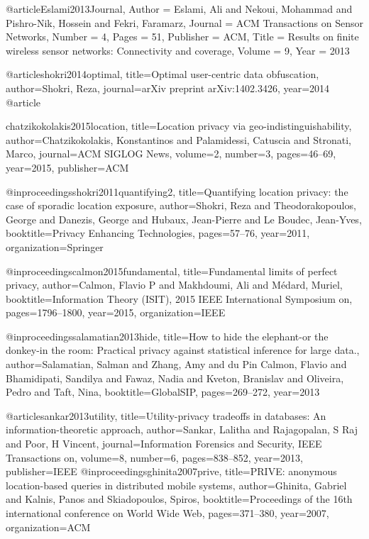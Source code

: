 {{@article{Eslami2013Journal,
	Author = {Eslami, Ali and Nekoui, Mohammad and Pishro-Nik, Hossein and Fekri, Faramarz},
	Journal = {ACM Transactions on Sensor Networks},
	Number = {4},
	Pages = {51},
	Publisher = {ACM},
	Title = {Results on finite wireless sensor networks: Connectivity and coverage},
	Volume = {9},
	Year = {2013}}

@article{shokri2014optimal,
	  title={Optimal user-centric data obfuscation},
 	 author={Shokri, Reza},
 	 journal={arXiv preprint arXiv:1402.3426},
 	 year={2014}
	}
@article{chatzikokolakis2015location,
  title={Location privacy via geo-indistinguishability},
  author={Chatzikokolakis, Konstantinos and Palamidessi, Catuscia and Stronati, Marco},
  journal={ACM SIGLOG News},
  volume={2},
  number={3},
  pages={46--69},
  year={2015},
  publisher={ACM}

}
@inproceedings{shokri2011quantifying2,
  title={Quantifying location privacy: the case of sporadic location exposure},
  author={Shokri, Reza and Theodorakopoulos, George and Danezis, George and Hubaux, Jean-Pierre and Le Boudec, Jean-Yves},
  booktitle={Privacy Enhancing Technologies},
  pages={57--76},
  year={2011},
  organization={Springer}
}

@inproceedings{calmon2015fundamental,
  title={Fundamental limits of perfect privacy},
  author={Calmon, Flavio P and Makhdoumi, Ali and M{\'e}dard, Muriel},
  booktitle={Information Theory (ISIT), 2015 IEEE International Symposium on},
  pages={1796--1800},
  year={2015},
  organization={IEEE}
}

@inproceedings{salamatian2013hide,
  title={How to hide the elephant-or the donkey-in the room: Practical privacy against statistical inference for large data.},
  author={Salamatian, Salman and Zhang, Amy and du Pin Calmon, Flavio and Bhamidipati, Sandilya and Fawaz, Nadia and Kveton, Branislav and Oliveira, Pedro and Taft, Nina},
  booktitle={GlobalSIP},
  pages={269--272},
  year={2013}
}

@article{sankar2013utility,
  title={Utility-privacy tradeoffs in databases: An information-theoretic approach},
  author={Sankar, Lalitha and Rajagopalan, S Raj and Poor, H Vincent},
  journal={Information Forensics and Security, IEEE Transactions on},
  volume={8},
  number={6},
  pages={838--852},
  year={2013},
  publisher={IEEE}
}
@inproceedings{ghinita2007prive,
  title={PRIVE: anonymous location-based queries in distributed mobile systems},
  author={Ghinita, Gabriel and Kalnis, Panos and Skiadopoulos, Spiros},
  booktitle={Proceedings of the 16th international conference on World Wide Web},
  pages={371--380},
  year={2007},
  organization={ACM}
}

}}
